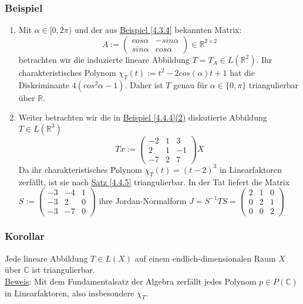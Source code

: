 \subsubsection{Beispiel}
\numbers
\begin{enumerate}
\item Mit $\alpha \in [0,2\pi )$ und der aus \hyperref[4.3.4]{Beispiel \ref{4.3.4}} bekannten Matrix:
\[A:=\begin{pmatrix}cos \alpha & -sin\alpha\\ sin\alpha & cos\alpha\end{pmatrix}\in\mathbb{R}^{2\times 2}\]
betrachten wir die induzierte lineare Abbildung $T=T_A\in L(\mathbb{R}^2)$.  Ihr charakteristisches Polynom $\chi _T(t):=t^2-2cos(\alpha )t+1$ hat die Diskriminante $4(cos^2\alpha -1)$.  Daher ist $T$ genau für $\alpha \in \{0,\pi \}$ triangulierbar über $\mathbb{R}$.
\item Weiter betrachten wir die in \hyperref[4.4.4]{Beispiel \ref{4.4.4}(2)} diskutierte Abbildung $T\in L(\mathbb{R}^3)$
\[Tx:=\begin{pmatrix}-2 & 1 & 3\\ 2 & 1 & -1\\ -7 & 2 & 7\end{pmatrix}X\]
Da ihr charakteristisches Polynom $\chi _T(t)=(t-2)^3$ in Linearfaktoren zerfällt, ist sie nach \hyperref[4.4.5]{Satz \ref{4.4.5}} triangulierbar.  In der Tat liefert die Matrix $S:=\begin{pmatrix}-3 & -4 & 1\\ -3 & 2 & 0\\ -3 & -7 & 0\end{pmatrix}$ ihre Jordan-Normalform $J=S^{-1}TS=\begin{pmatrix}2 & 1 & 0\\ 0 & 2 & 1\\ 0 & 0 & 2\end{pmatrix}$
\end{enumerate}
\subsubsection{Korollar}
Jede lineare Abbildung $T\in L(X)$ auf einem endlich-dimensionalen Raum $X$ über $\mathbb{C}$ ist triangulierbar.\\
\underline{Beweis}: Mit dem Fundamentalsatz der Algebra zerfällt jedes Polynom $p\in P(\mathbb{C})$ in Linearfaktoren, also insbesondere $\chi _T$.
